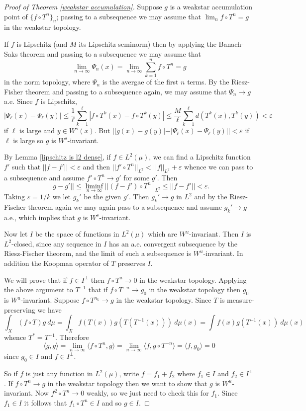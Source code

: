 \documentclass[12pt]{report}
\theoremstyle{definition}
\begin{document}
\begin{proof}[Proof of Theorem \ref{weakstar accumulation}]
Suppose $g$ is a weakstar accumulation point of $\{f \circ T^n\}_n$; passing to a subsequence we may assume that $\lim_n f \circ T^n = g$ in the weakstar topology.

If $f$ is Lipschitz (and $M$ its Lipschitz seminorm) then by applying the Banach-Saks theorem and passing to a subsequence we may assume that
$$\lim_{n \to \infty} \Psi_n(x) = \lim_{n \to \infty} \sum_{k=1}^n f \circ T^n = g$$
in the norm topology, where $\Psi_n$ is the avergae of the first $n$ terms. By the Riesz-Fisher theorem and passing to a subsequence again, we may assume that $\Psi_n \to g$ a.e. Since $f$ is Lipschitz,
$$|\Psi_\ell(x) - \Psi_\ell(y)| \leq \frac{1}{\ell} \sum_{k=1}^\ell |f \circ T^k(x) - f \circ T^k(y)| \leq \frac{M}{\ell} \sum_{k=1}^\ell d(T^k(x), T^k(y)) < \varepsilon$$
if $\ell$ is large and $y \in W^s(x)$. But $||g(x) - g(y)| - |\Psi_\ell(x) - \Psi_\ell(y)|| < \varepsilon$ if $\ell$ is large so $g$ is $W^s$-invariant.

By Lemma \ref{lipschitz is l2 dense}, if $f \in L^2(\mu)$, we can find a Lipschitz function $f'$ such that $||f - f'|| < \varepsilon$ and then $||f' \circ T^n||_{L^2} < ||f||_{L^2} + \varepsilon$ whence we can pass to a subsequence and assume $f' \circ T^n \to g'$ for some $g'$. Then
$$||g - g'|| \leq \liminf_{n \to \infty} ||(f - f') \circ T^n||_{L^2} \leq ||f - f'|| < \varepsilon.$$
Taking $\varepsilon = 1/k$ we let $g_k'$ be the given $g'$. Then $g_k' \to g$ in $L^2$ and by the Riesz-Fischer theorem again we may again pass to a subsequence and assume $g_k' \to g$ a.e., which implies that $g$ is $W^s$-invariant.

Now let $I$ be the space of functions in $L^2(\mu)$ which are $W^u$-invariant. Then $I$ is $L^2$-closed, since any sequence in $I$ has an a.e. convergent subsequence by the Riesz-Fischer theorem, and the limit of such a subsequence is $W^u$-invariant. In addition the Koopman operator of $T$ preserves $I$.

We will prove that if $f \in I^\perp$ then $f \circ T^n \to 0$ in the weakstar topology. Applying the above argument to $T^{-1}$ that if $f \circ T^{-n} \to g_0$ in the weakstar topology then $g_0$ is $W^u$-invariant. Suppose $f \circ T^{n_k} \to g$ in the weakstar topology. Since $T$ is measure-preserving we have
$$\int_X (f \circ T)g ~d\mu = \int_X f(T(x))g(T(T^{-1}(x))) ~d\mu(x) = \int f(x)g(T^{-1}(x)) ~d\mu(x)$$
whence $T^* = T^{-1}$. Therefore
$$\langle g, g\rangle = \lim_{n \to \infty} \langle f \circ T^n, g\rangle = \lim_{n \to \infty} \langle f, g \circ T^{-n}\rangle = \langle f, g_0\rangle = 0$$
since $g_0 \in I$ and $f \in I^\perp$.

So if $f$ is just any function in $L^2(\mu)$, write $f = f_1 + f_2$ where $f_1 \in I$ and $f_2 \in I^\perp$. If $f \circ T^n \to g$ in the weakstar topology then we want to show that $g$ is $W^u$-invariant.
Now $f^2 \circ T^n \to 0$ weakly, so we just need to check this for $f_1$. Since $f_1 \in I$ it follows that $f_1 \circ T^n \in I$ and so $g \in I$.
\end{proof}
\end{document}
